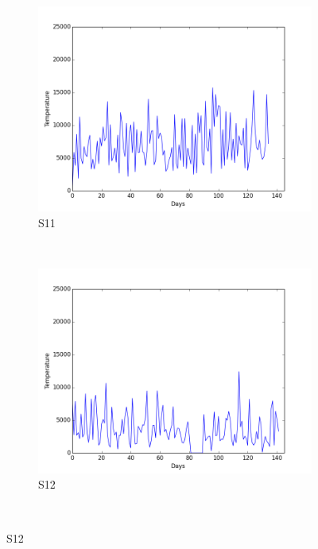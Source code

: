 \documentclass[12pt]{article} %
\begin{document}
\begin{figure}[H]
    \centering
    \begin{subfigure}[b]{0.30\textwidth}
        \includegraphics[width=\textwidth]{img/graphs/11-steps-1}
        \caption{S11}
        \label{fig:s11Steps}
    \end{subfigure}
    ~ %
    \begin{subfigure}[b]{0.30\textwidth}
        \includegraphics[width=\textwidth]{img/graphs/12-steps-1}
        \caption{S12}
        \label{fig:s12Steps}
    \end{subfigure}
    ~ %

\end{figure}
\end{document}
